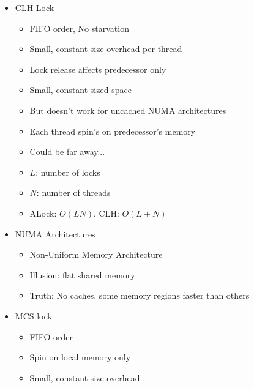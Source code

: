 \documentclass[12pt]{article}
\begin{document}
{\begin{itemize}
\begin{itemize}
\begin{itemize}
					\item FIFO fairness
					\item First truly scalable lock
					\item Simple, easy to implement
					\item Space hog, One bit per thread
				\end{itemize}
				\item CLH Lock
				\begin{itemize}
					\item FIFO order, No starvation
					\item Small, constant size overhead per thread
					\item Lock release affects predecessor only
					\item Small, constant sized space
					\item But doesn't work for uncached NUMA architectures
					\item Each thread spin's on predecessor's memory
					\item Could be far away...
				\end{itemize}
				\begin{itemize}
					\item $L$: number of locks
					\item $N$: number of threads
					\item ALock: $O(LN)$, CLH: $O(L+N)$ 		
				\end{itemize}
				\item NUMA Architectures
				\begin{itemize}
					\item Non-Uniform Memory Architecture
					\item Illusion: flat shared memory
					\item Truth: No caches, some memory regions faster than others
				\end{itemize}
				\item MCS lock
				\begin{itemize}
					\item FIFO order
					\item Spin on local memory only
					\item Small, constant size overhead
				\end{itemize}
			\end{itemize}
			
		\end{itemize}
		
}
\end{document}
